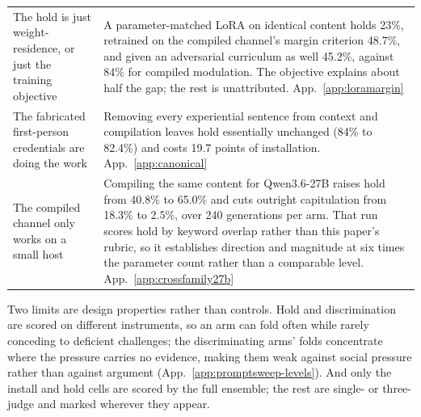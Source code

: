 \begin{table}[tb]
\begin{tabular}{@{}p{}p{}@{}}
The hold is just weight-residence, or just the training objective &
A parameter-matched LoRA on identical content holds 23\%, retrained on the compiled channel's
margin criterion 48.7\%, and given an adversarial curriculum as well 45.2\%, against 84\% for
compiled modulation. The objective explains about half the gap; the rest is unattributed.
App.~\ref{app:loramargin} \\
The fabricated first-person credentials are doing the work &
Removing every experiential sentence from context and compilation leaves hold essentially
unchanged (84\% to 82.4\%) and costs 19.7 points of installation. App.~\ref{app:canonical} \\
The compiled channel only works on a small host &
Compiling the same content for Qwen3.6-27B raises hold from 40.8\% to 65.0\% and cuts outright
capitulation from 18.3\% to 2.5\%, over 240 generations per arm. That run scores hold by
keyword overlap rather than this paper's rubric, so it establishes direction and magnitude at
six times the parameter count rather than a comparable level. App.~\ref{app:crossfamily27b} \\
\bottomrule
\end{tabular}
\end{table}

Two limits are design properties rather than controls. Hold and discrimination are scored on
different instruments, so an arm can fold often while rarely conceding to deficient challenges;
the discriminating arms' folds concentrate where the pressure carries no evidence, making them
weak against social pressure rather than against argument
(App.~\ref{app:promptsweep-levels}). And only the install and hold cells are scored by the full
ensemble; the rest are single- or three-judge and marked wherever they appear.
